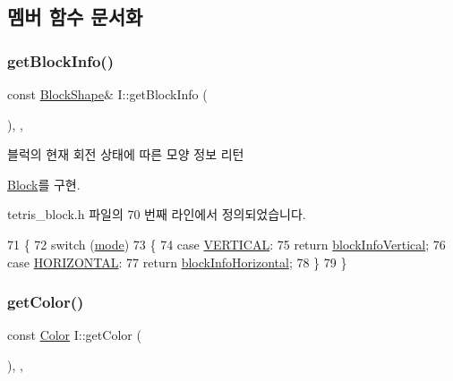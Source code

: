 \subsection{멤버 함수 문서화}
\mbox{\label{class_i_a21f835547d478a560c6616d8ca81e966}} 
\subsubsection{\texorpdfstring{get\+Block\+Info()}{getBlockInfo()}}
{\footnotesize\ttfamily const \mbox{\hyperlink{class_block_aca5d951639f113e2ebd7856209d6b9ab}{Block\+Shape}}\& I\+::get\+Block\+Info (\begin{DoxyParamCaption}{ }\end{DoxyParamCaption})\hspace{0.3cm}{\ttfamily [inline]}, {\ttfamily [override]}, {\ttfamily [virtual]}}



블럭의 현재 회전 상태에 따른 모양 정보 리턴 



\mbox{\hyperlink{class_block_a2cdc0af223d621add42ac6c37fede329}{Block}}를 구현.



tetris\+\_\+block.\+h 파일의 70 번째 라인에서 정의되었습니다.


\begin{DoxyCode}
71     \{
72         \textcolor{keywordflow}{switch} (\mbox{\hyperlink{class_i_a97884fed99bc779803178b5c3f4bc02d}{mode}})
73         \{
74         \textcolor{keywordflow}{case} \mbox{\hyperlink{class_block_a33a96023993478ad4b52426188454765a76628d7877667ccb2f6e549b89466a4a}{VERTICAL}}:
75             \textcolor{keywordflow}{return} \mbox{\hyperlink{class_i_a78fdc2abb810f708c2595846c74ad1ca}{blockInfoVertical}};
76         \textcolor{keywordflow}{case} \mbox{\hyperlink{class_block_a33a96023993478ad4b52426188454765a883bda1b4a0cb6d25d8b3c3465f0cfef}{HORIZONTAL}}:
77             \textcolor{keywordflow}{return} \mbox{\hyperlink{class_i_af8e5eabbd3a5e1fef9066d3a6fa44adc}{blockInfoHorizontal}};
78         \}
79     \}
\end{DoxyCode}
\mbox{\label{class_i_afa15b62959b0207778d0db1763aff784}} 
\subsubsection{\texorpdfstring{get\+Color()}{getColor()}}
{\footnotesize\ttfamily const \mbox{\hyperlink{class_block_ad054b4ac51df79aa910040b2a2fdf7b5}{Color}} I\+::get\+Color (\begin{DoxyParamCaption}{ }\end{DoxyParamCaption})\hspace{0.3cm}{\ttfamily [inline]}, {\ttfamily [override]}, {\ttfamily [virtual]}}



